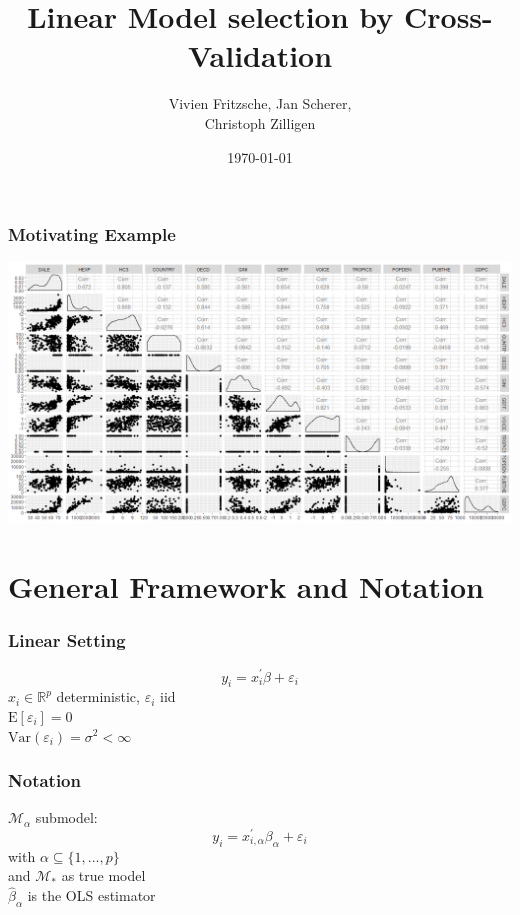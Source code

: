 \documentclass[20pt,mathserif]{beamer}
\title[Cross Validation]{ Linear Model selection by Cross-Validation}
\author{ Vivien Fritzsche, Jan Scherer, \\ Christoph Zilligen}
\date{\today}
\newcommand{\E}{\mathrm{E}}
\newcommand{\Var}{\mathrm{Var}}
\begin{document}
\beamertemplatenavigationsymbolsempty
\begin{frame}
\titlepage
\thispagestyle{empty}
\end{frame}

\begin{frame}
\frametitle{Motivating Example}
\centering
\includegraphics[width=1.25\textheight]{scatterplot.png}
\end{frame}

\thispagestyle{empty}
\section{General Framework and Notation}

\begin{frame}
\frametitle{Linear Setting}
\[
	y_i=x_i^\prime\beta+\varepsilon_i
\]
$x_i\in \mathbb{R}^p$ deterministic, $\varepsilon_i$ iid \\\vspace*{5pt}
$\E[\varepsilon_i]=0$\\\vspace*{5pt}
$\Var(\varepsilon_i)=\sigma^2<\infty$
\end{frame}

\begin{frame}
\frametitle{Notation}
$\mathcal{M}_\alpha$ submodel:
\[
	y_i=x_{i,\alpha}^\prime\beta_\alpha+\varepsilon_i
\]
with $\alpha\subseteq\{1,\ldots,p\}$\\\vspace*{5pt}
and $\mathcal{M}_\ast$ as true model\\\vspace*{5pt}
$\hat{\beta}_\alpha$ is the OLS estimator
\end{frame}
\end{document}
